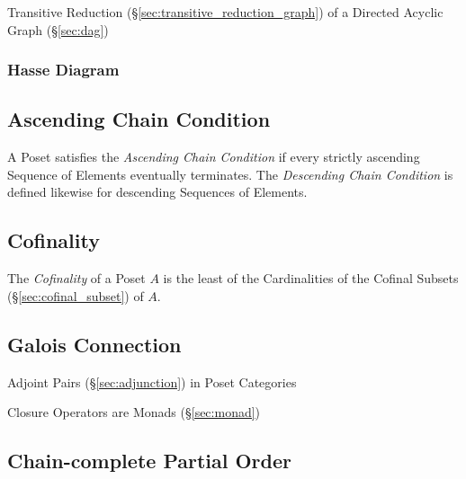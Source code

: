 Transitive Reduction (\S\ref{sec:transitive_reduction_graph}) of a
Directed Acyclic Graph (\S\ref{sec:dag})



\subsubsection{Hasse Diagram}\label{sec:hasse_diagram}



\subsection{Ascending Chain Condition}\label{sec:ascending_chain}

A Poset satisfies the \emph{Ascending Chain Condition} if every
strictly ascending Sequence of Elements eventually terminates. The
\emph{Descending Chain Condition} is defined likewise for descending
Sequences of Elements.



\subsection{Cofinality}\label{sec:cofinality}

The \emph{Cofinality} of a Poset $A$ is the least of the Cardinalities
of the Cofinal Subsets (\S\ref{sec:cofinal_subset}) of $A$.



\subsection{Galois Connection}\label{sec:galois_connection}

Adjoint Pairs (\S\ref{sec:adjunction}) in Poset Categories

Closure Operators are Monads (\S\ref{sec:monad})



\subsection{Chain-complete Partial Order}\label{sec:cpo}

